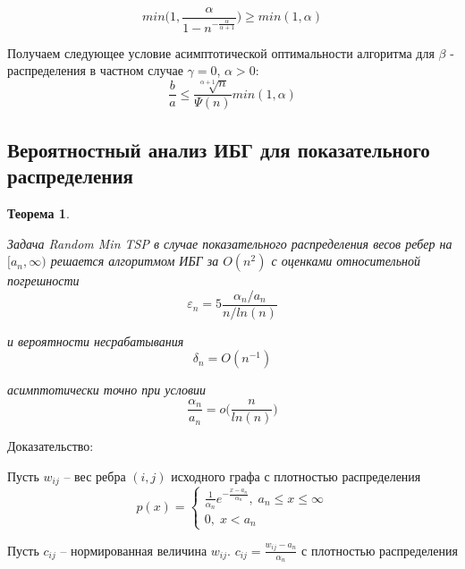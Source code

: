 \documentclass[a4paper, 14pt]{extarticle}
\numberwithin{equation}{section}
\newtheorem{theorem}{Теорема}[section]
\begin{document}
\begin{equation*}
min \Big(1, \frac{\alpha}{1-n^{-\frac{\alpha}{\alpha+1}}} \Big) \geqslant min(1, \alpha)
\end{equation*}

Получаем следующее условие асимптотической оптимальности алгоритма \text{\algorithm} для $\beta$ - распределения в частном случае $\gamma=0$, $\alpha>0$:
\begin{equation*}
\frac{b}{a} \leqslant \frac{\sqrt[\alpha+1]{n}}{\Psi(n)}min(1,\alpha)
\end{equation*}


\subsection{Вероятностный анализ ИБГ для показательного распределения}

\begin{theorem}
\label{theoremthree}

Задача Random Min TSP в случае показательного распределения весов ребер на $[a_n,\infty)$ решается алгоритмом ИБГ за $O(n^2)$ с оценками относительной погрешности
\begin{equation*}
\varepsilon_n = 5 \frac{\alpha_n/a_n}{n/ln(n)}
\end{equation*}

и вероятности несрабатывания
\begin{equation*}
\delta_n = O(n^{-1})
\end{equation*}

асимптотически точно при условии
\begin{equation*}
\frac{\alpha_n}{a_n} = o \Big(\frac{n}{ln(n)} \Big)
\end{equation*}

\end{theorem}

Доказательство:

Пусть $w_{ij}$ -- вес ребра $(i, j)$ исходного графа с плотностью распределения
\begin{equation*}
p(x) = \begin{cases}
\frac{1}{\alpha_n} e^{-\frac{x-a_n}{\alpha_n}}, \; a_n \leqslant x \leqslant \infty \\
0, \; x < a_n
\end{cases}
\end{equation*}

Пусть $c_{ij}$ -- нормированная величина $w_{ij}$. $c_{ij} = \frac{w_{ij}-a_n}{\alpha_n}$  с плотностью распределения
\end{document}
